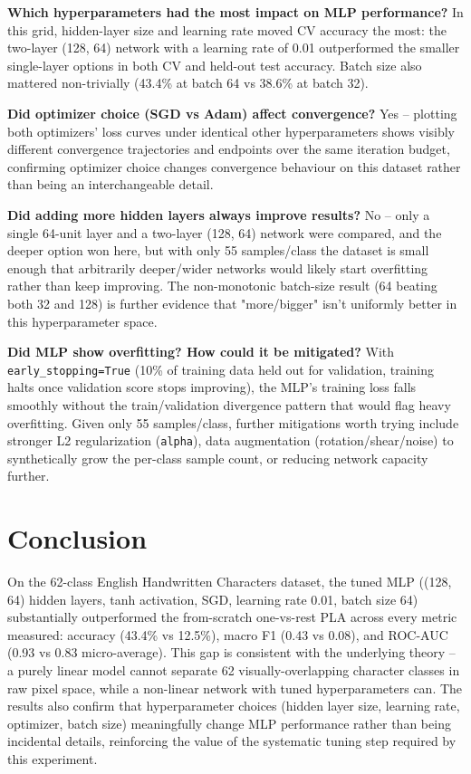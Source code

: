 \documentclass[11pt]{article}
\begin{document}
\textbf{Which hyperparameters had the most impact on MLP performance?} In this grid, hidden-layer
size and learning rate moved CV accuracy the most: the two-layer (128, 64) network with a
learning rate of 0.01 outperformed the smaller single-layer options in both CV and held-out
test accuracy. Batch size also mattered non-trivially (43.4\% at batch 64 vs 38.6\% at batch
32).

\textbf{Did optimizer choice (SGD vs Adam) affect convergence?} Yes -- plotting both optimizers'
loss curves under identical other hyperparameters shows visibly different convergence
trajectories and endpoints over the same iteration budget, confirming optimizer choice
changes convergence behaviour on this dataset rather than being an interchangeable detail.

\textbf{Did adding more hidden layers always improve results?} No -- only a single 64-unit layer
and a two-layer (128, 64) network were compared, and the deeper option won here, but with
only 55 samples/class the dataset is small enough that arbitrarily deeper/wider networks
would likely start overfitting rather than keep improving. The non-monotonic batch-size
result (64 beating both 32 and 128) is further evidence that "more/bigger" isn't uniformly
better in this hyperparameter space.

\textbf{Did MLP show overfitting? How could it be mitigated?} With \texttt{early\_stopping=True} (10\% of
training data held out for validation, training halts once validation score stops
improving), the MLP's training loss falls smoothly without the train/validation divergence
pattern that would flag heavy overfitting. Given only 55 samples/class, further mitigations
worth trying include stronger L2 regularization (\texttt{alpha}), data augmentation
(rotation/shear/noise) to synthetically grow the per-class sample count, or reducing network
capacity further.

\section{Conclusion}
\label{sec:org2fc61db}

On the 62-class English Handwritten Characters dataset, the tuned MLP ((128, 64) hidden
layers, tanh activation, SGD, learning rate 0.01, batch size 64) substantially outperformed
the from-scratch one-vs-rest PLA across every metric measured: accuracy (43.4\% vs 12.5\%),
macro F1 (0.43 vs 0.08), and ROC-AUC (0.93 vs 0.83 micro-average). This gap is consistent
with the underlying theory -- a purely linear model cannot separate 62 visually-overlapping
character classes in raw pixel space, while a non-linear network with tuned hyperparameters
can. The results also confirm that hyperparameter choices (hidden layer size, learning rate,
optimizer, batch size) meaningfully change MLP performance rather than being incidental
details, reinforcing the value of the systematic tuning step required by this experiment.
\end{document}
